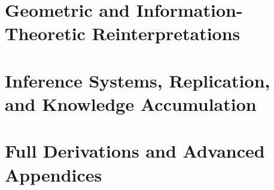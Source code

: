 \documentclass[11pt, twoside, openright]{book}
\theoremstyle{plain}
\theoremstyle{definition}
\theoremstyle{remark}
\begin{document}
\part{Geometric and Information-Theoretic Reinterpretations}




\part{Inference Systems, Replication, and Knowledge Accumulation}





\part{Full Derivations and Advanced Appendices}
\appendix






\backmatter



\printindex
\end{document}
